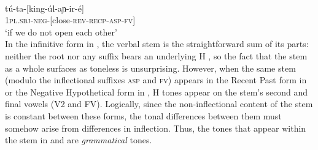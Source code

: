 \documentclass[output=paper
,newtxmath
,modfonts
,nonflat]{langsci/langscibook}
\begin{document}
\ex\label{ex:jones:1c}
\\
\gll   tú-ta-[king-úl-aɲ-ir-é]\\
      \textsc{1pl.sbj-neg-[}close\textsc{-rev-recp-asp-fv]}\\
\glt ‘if we do not open each other’\\
\z
\z
In the infinitive form in , the verbal stem is the straightforward sum of its parts: neither the root nor any suffix bears an underlying H , so the fact that the stem as a whole surfaces as toneless is unsurprising. However, when the same stem (modulo the inflectional suffixes \textsc{asp} and \textsc{fv}) appears in the Recent Past form in  or the Negative Hypothetical form in , H tones appear on the stem’s second and final vowels (V2 and FV). Logically, since the non-inflectional content of the stem is constant between these forms, the tonal differences between them must somehow arise from differences in inflection. Thus, the tones that appear within the stem in  and  are \textit{grammatical} tones.
\end{document}
